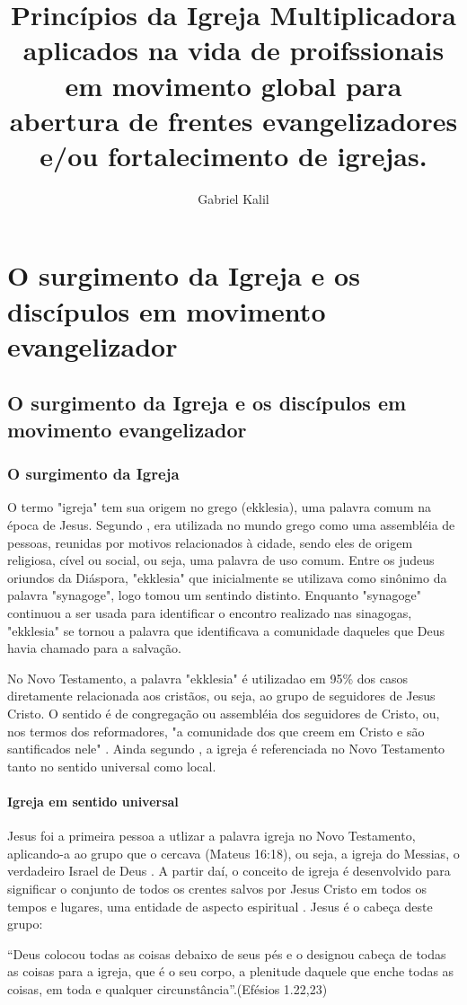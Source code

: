 \documentclass[
	12pt,				%
	openright,			%
	twoside,			%
	a4paper,			%
	english,			%
	french,				%
	spanish,			%
	brazil				%
	]{abntex2}
\title{Princípios da Igreja Multiplicadora aplicados na vida de proifssionais em movimento global para abertura de frentes evangelizadores e/ou fortalecimento de igrejas.}
\author{Gabriel Kalil}
\date{ }
\begin{document}
\maketitle
  
\tableofcontents

\chapter{O surgimento da Igreja e os discípulos em movimento evangelizador}

\section{O surgimento da Igreja e os discípulos em movimento evangelizador}
 
\subsection{O surgimento da Igreja}

O termo "igreja" tem sua origem no grego (ekklesia), uma palavra comum na época de Jesus. Segundo \cite[317]{zac}, era utilizada no mundo grego como uma assembléia de pessoas, reunidas por motivos relacionados à cidade, sendo eles de origem religiosa, cível ou social, ou seja, uma palavra de uso comum. Entre os judeus oriundos da Diáspora, "ekklesia" que inicialmente se utilizava como sinônimo da palavra "synagoge", logo tomou um sentindo distinto. Enquanto "synagoge" continuou a ser usada para identificar o encontro realizado nas sinagogas, "ekklesia" se tornou a palavra que identificava a comunidade daqueles que Deus havia chamado para a salvação\cite[485]{bavinck}. 

No Novo Testamento, a palavra "ekklesia" é utilizadao em 95\% dos casos diretamente relacionada aos cristãos, ou seja, ao grupo de seguidores de Jesus Cristo. O sentido é de congregação ou assembléia dos seguidores de Cristo, ou, nos termos dos reformadores, "a comunidade dos que creem em Cristo e são santificados nele" \cite[318]{zac}. Ainda segundo \cite[318]{zac}, a igreja é referenciada no Novo Testamento tanto no sentido universal como local. 

\subsubsection{Igreja em sentido universal}

Jesus foi a primeira pessoa a utlizar a palavra igreja no Novo Testamento, aplicando-a ao grupo que o cercava (Mateus 16:18), ou seja, a igreja do Messias, o verdadeiro Israel de Deus \cite[911]{berkhof}. A partir daí, o conceito de igreja é desenvolvido para significar o conjunto de todos os crentes salvos por Jesus Cristo em todos os tempos e lugares, uma entidade de aspecto espiritual \cite[318]{zac}. Jesus é o cabeça deste grupo:
\begin{citacao}“Deus colocou todas as coisas debaixo de seus pés e o designou cabeça de todas as coisas para a igreja, que é o seu corpo, a plenitude daquele que enche todas as coisas, em toda e qualquer circunstância”.(Efésios 1.22,23)
\end{citacao}
\end{document}
